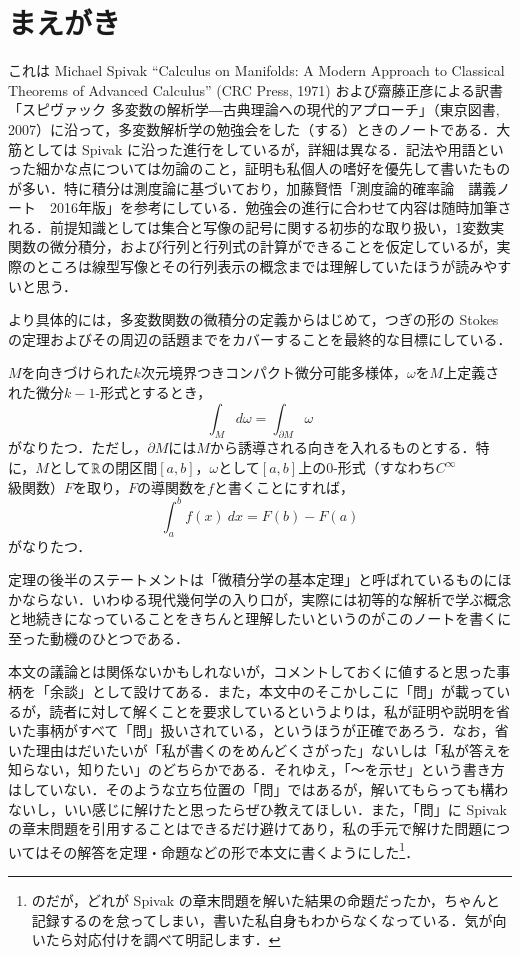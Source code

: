 \section*{まえがき}

これは Michael Spivak ``Calculus on Manifolds: A Modern Approach to Classical Theorems of Advanced Calculus'' (CRC Press, 1971) および齋藤正彦による訳書「スピヴァック 多変数の解析学―古典理論への現代的アプローチ」（東京図書, 2007）に沿って，多変数解析学の勉強会をした（する）ときのノートである．大筋としては Spivak に沿った進行をしているが，詳細は異なる．記法や用語といった細かな点については勿論のこと，証明も私個人の嗜好を優先して書いたものが多い．特に積分は測度論に基づいており，加藤賢悟「測度論的確率論　講義ノート　2016年版」を参考にしている．勉強会の進行に合わせて内容は随時加筆される．前提知識としては集合と写像の記号に関する初歩的な取り扱い，1変数実関数の微分積分，および行列と行列式の計算ができることを仮定しているが，実際のところは線型写像とその行列表示の概念までは理解していたほうが読みやすいと思う．

より具体的には，多変数関数の微積分の定義からはじめて，つぎの形の Stokes の定理およびその周辺の話題までをカバーすることを最終的な目標にしている．
\begin{thm*}
$M$を向きづけられた$k$次元境界つきコンパクト微分可能多様体，$\omega$を$M$上定義された微分$k-1$-形式とするとき，
\begin{equation}
\int_M d\omega = \int_{\partial M} \omega
\end{equation}がなりたつ．ただし，$\partial M$には$M$から誘導される向きを入れるものとする．特に，$M$として$\mathbb{R}$の閉区間$[a,b]$，$\omega$として$[a,b]$上の0-形式（すなわち$C^\infty$級関数）$F$を取り，$F$の導関数を$f$と書くことにすれば，
\begin{equation}
\int_a^b f(x)\ dx = F(b) - F(a)
\end{equation}がなりたつ．
\end{thm*}
定理の後半のステートメントは「微積分学の基本定理」と呼ばれているものにほかならない．いわゆる現代幾何学の入り口が，実際には初等的な解析で学ぶ概念と地続きになっていることをきちんと理解したいというのがこのノートを書くに至った動機のひとつである．

本文の議論とは関係ないかもしれないが，コメントしておくに値すると思った事柄を「余談」として設けてある．また，本文中のそこかしこに「問」が載っているが，読者に対して解くことを要求しているというよりは，私が証明や説明を省いた事柄がすべて「問」扱いされている，というほうが正確であろう．なお，省いた理由はだいたいが「私が書くのをめんどくさがった」ないしは「私が答えを知らない，知りたい」のどちらかである．それゆえ，「〜を示せ」という書き方はしていない．そのような立ち位置の「問」ではあるが，解いてもらっても構わないし，いい感じに解けたと思ったらぜひ教えてほしい．また，「問」に Spivak の章末問題を引用することはできるだけ避けてあり，私の手元で解けた問題についてはその解答を定理・命題などの形で本文に書くようにした\footnote{のだが，どれが Spivak の章末問題を解いた結果の命題だったか，ちゃんと記録するのを怠ってしまい，書いた私自身もわからなくなっている．気が向いたら対応付けを調べて明記します．}．

